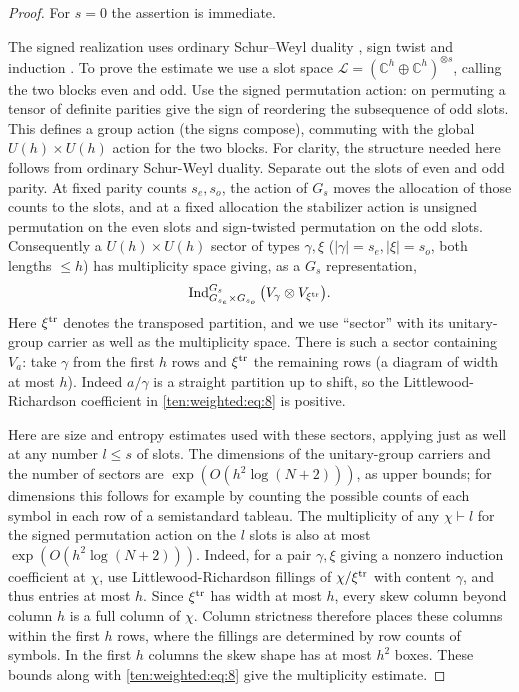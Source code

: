 \begin{proof}
For \(s=0\) the assertion is immediate.

The signed realization uses ordinary Schur--Weyl duality \cite[Theorem~4.57 and Corollary~4.59]{etingof}, sign twist and induction \cite[Theorems~6.7 and~16.4]{James1978}. To prove the estimate we use a slot space
\(\mathcal L=(\mathbb C^h\oplus\mathbb C^h)^{\otimes s}\), calling the two blocks even and odd. Use the signed permutation action: on permuting a tensor of definite parities give the sign of reordering the subsequence of odd slots. This defines a group action (the signs compose), commuting with the global \(U(h)\times U(h)\) action for the two blocks. For clarity, the structure needed here follows from ordinary Schur-Weyl duality. Separate out the slots of even and odd parity. At fixed parity counts \(s_e,s_o\), the action of \(G_s\) moves the allocation of those counts to the slots, and at a fixed allocation the stabilizer action is unsigned permutation on the even slots and sign-twisted permutation on the odd slots. Consequently a \(U(h)\times U(h)\) sector of types \(\gamma,\xi\) (\(|\gamma|=s_e,|\xi|=s_o\), both lengths \(\le h\)) has multiplicity space giving, as a \(G_s\) representation,
\begin{equation}
 \operatorname{Ind}_{G_{s_e}\times G_{s_o}}^{G_s}\big(V_\gamma\otimes V_{\xi^{\rm tr}}\big).   \label{ten:weighted:eq:8}
\end{equation}
Here \(\xi^{\rm tr}\) denotes the transposed partition, and we use ``sector'' with its unitary-group carrier as well as the multiplicity space. There is such a sector containing \(V_a\): take \(\gamma\) from the first \(h\) rows and \(\xi^{\rm tr}\) the remaining rows (a diagram of width at most \(h\)). Indeed \(a/\gamma\) is a straight partition up to shift, so the Littlewood-Richardson coefficient in \eqref{ten:weighted:eq:8} is positive.

Here are size and entropy estimates used with these sectors, applying just as well at any number \(l\le s\) of slots. The dimensions of the unitary-group carriers and the number of sectors are \(\exp(O(h^2\log(N+2)))\), as upper bounds; for dimensions this follows for example by counting the possible counts of each symbol in each row of a semistandard tableau. The multiplicity of any \(\chi\vdash l\) for the signed permutation action on the \(l\) slots is also at most \(\exp(O(h^2\log(N+2)))\). Indeed, for a pair \(\gamma,\xi\) giving a nonzero induction coefficient at \(\chi\), use Littlewood-Richardson fillings of \(\chi/\xi^{\rm tr}\) with content \(\gamma\), and thus entries at most \(h\). Since \(\xi^{\rm tr}\) has width at most \(h\), every skew column beyond column \(h\) is a full column of \(\chi\). Column strictness therefore places these columns within the first \(h\) rows, where the fillings are determined by row counts of symbols. In the first \(h\) columns the skew shape has at most \(h^2\) boxes. These bounds along with \eqref{ten:weighted:eq:8} give the multiplicity estimate.


\end{proof}
